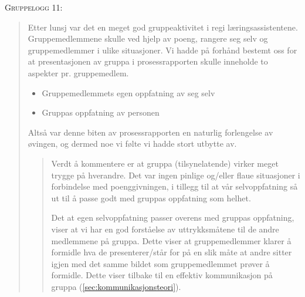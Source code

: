 \textsc{Gruppelogg 11:}
\begin{quote}
Etter lunsj var det en meget god gruppeaktivitet i regi læringsassistentene.
Gruppemedlemmene skulle ved hjelp av poeng, rangere seg selv og gruppemedlemmer
i ulike situasjoner. Vi hadde på forhånd bestemt oss for at presentasjonen av
gruppa i prosessrapporten skulle inneholde to aspekter pr. gruppemedlem.
\begin{itemize}
\item Gruppemedlemmets egen oppfatning av seg selv
\item Gruppas oppfatning av personen
\end{itemize}
Altså var denne biten av prosessrapporten en naturlig forlengelse av øvingen, og
dermed noe vi følte vi hadde stort utbytte av.
\begin{quote}

Verdt å kommentere er at gruppa (tilsynelatende) virker meget trygge på hverandre.
Det var ingen pinlige og/eller flaue situasjoner i forbindelse med
poenggivningen, i tillegg til at vår selvoppfatning så ut til å passe godt med
gruppas oppfatning som helhet.

Det at egen selvoppfatning passer overens med gruppas oppfatning, viser at vi har en god
forståelse av uttrykksmåtene til de andre medlemmene på gruppa. Dette viser at gruppemedlemmer
klarer å formidle hva de presenterer/står for på en slik måte at andre sitter
igjen med det samme bildet som gruppemedlemmet prøver å formidle. Dette viser
tilbake til en effektiv kommunikasjon på gruppa (\ref{sec:kommunikasjonsteori}).



\end{quote}
\end{quote}
